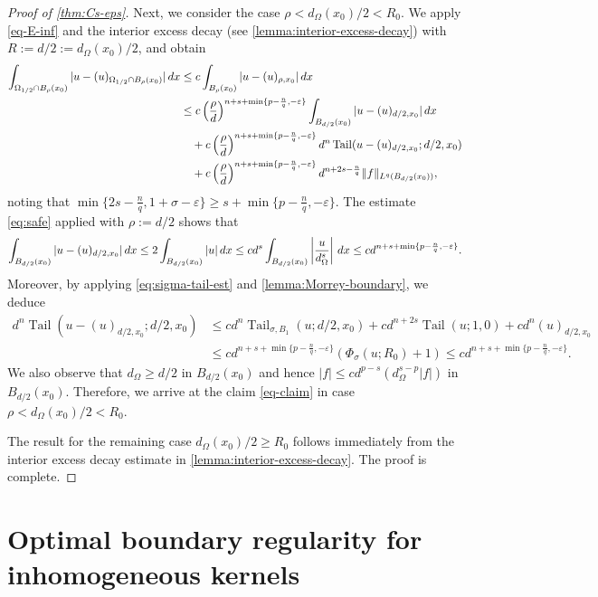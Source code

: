 \documentclass[11pt,reqno]{amsart}
\theoremstyle{plain}
\theoremstyle{definition}
\numberwithin{equation}{section}
\newcommand{\1}{\mathbbm{1}}
\DeclareMathOperator{\tail}{Tail}
\renewcommand{\d}{\textnormal{\,d}}
\begin{document}
\begin{proof}[Proof of \autoref{thm:Cs-eps}]
Next, we consider the case $\rho < d_{\Omega}(x_0)/2 < R_0$. We apply \eqref{eq-E-inf} and the interior excess decay (see \autoref{lemma:interior-excess-decay}) with $R := d/2:=d_\Omega(x_0)/2$, and obtain
\begin{align*}
\int_{\Omega_{1/2} \cap B_\rho(x_0)} |u - (u)_{\Omega_{1/2}\cap B_\rho(x_0)}| \d x
&\leq c \int_{B_{\rho}(x_0)} |u - (u)_{\rho,x_0}| \d x \\
&\le c \left( \frac{\rho}{d} \right)^{n+ s+\min\{p-\frac{n}{q}, -\varepsilon\}} \int_{B_{d/2}(x_0)} |u - (u)_{d/2,x_0}| \d x \\
&\quad + c \left( \frac{\rho}{d} \right)^{n+ s+\min\{p-\frac{n}{q}, -\varepsilon\}}d^n\tail(u - (u)_{d/2,x_0}; d/2,x_0) \\
&\quad + c \left(\frac{\rho}{d}\right)^{n+ s+\min\{p-\frac{n}{q}, -\varepsilon\}} d^{n+2s-\frac{n}{q}} \Vert f \Vert_{L^q(B_{d/2}(x_0))},
\end{align*}
noting that $\min\{2s-\frac{n}{q}, 1+\sigma-\varepsilon\} \geq s+\min\{p-\frac{n}{q}, -\varepsilon\}$.
The estimate \eqref{eq:safe} applied with $\rho := d/2$ shows that
\begin{align*}
\int_{B_{d/2}(x_0)} |u - (u)_{d/2,x_0}| \d x \leq 2\int_{B_{d/2}(x_0)} |u| \d x \leq c d^{s} \int_{B_{d/2}(x_0)} \left| \frac{u}{d_\Omega^s} \right| \d x \leq cd^{n+s+\min\{p-\frac{n}{q}, -\varepsilon\}}.
\end{align*}
Moreover, by applying  \eqref{eq:sigma-tail-est} and \autoref{lemma:Morrey-boundary}, we deduce
\begin{align*}
    d^n \tail(u - (u)_{d/2,x_0}; d/2,x_0)
    &\leq cd^n\tail_{\sigma,B_1}(u; d/2,x_0) + cd^{n+2s} \tail(u;1,0) + cd^n(u)_{d/2,x_0} \\
    &\leq cd^{n+s+\min\{p-\frac{n}{q}, -\varepsilon\}} \left( \Phi_{\sigma}(u; R_0) + 1\right) \leq cd^{n+s+\min\{ p-\frac{n}{q}, -\varepsilon\}}.
\end{align*}
We also observe that $d_{\Omega} \geq d/2$ in $B_{d/2}(x_0)$ and hence $|f| \le cd^{p-s} (d_{\Omega}^{s-p} |f|)$ in $B_{d/2}(x_0)$. Therefore, we arrive at the claim \eqref{eq-claim} in case $\rho < d_{\Omega}(x_0)/2 < R_0$.

The result for the remaining case $d_\Omega(x_0)/2 \geq R_0$ follows immediately from the interior excess decay estimate in \autoref{lemma:interior-excess-decay}. The proof is complete.
\end{proof}

\section{Optimal boundary regularity for inhomogeneous kernels}
\label{sec:Cs}
\end{document}
